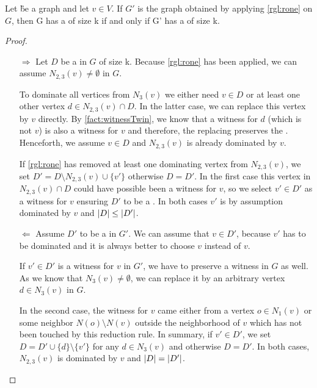 \begin{lemma}\label{lemma:correctnessone}
    Let \G be a graph and let $v \in V$. If $G'$ is the graph obtained by applying \cref{rgl:rone}   on $G$, then G has a \sdom of size k if and only if G' has a \sdom of size k.
\end{lemma}
\begin{proof}
    \begin{enumerate}
        \item[$\Rightarrow$] Let $D$ be a \sdom in $G$ of size k. 
        Because \cref{rgl:rone} has been applied, we can assume $N_{2,3}(v) \neq \emptyset$ in $G$. 
        
        To dominate all vertices from $N_3(v)$ we either need $v \in D$ or at least one other vertex $d \in N_{2,3}(v) \cap D$. In the latter case, we can replace this vertex by $v$ directly. By \cref{fact:witnessTwin}, we know that a witness for $d$  (which is not  $v$) is also a witness for $v$ and therefore, the replacing preserves the \sdom. Henceforth, we assume $v \in D$ and $N_{2,3}(v)$ is already dominated by $v$.

        If \cref{rgl:rone} has removed at least one dominating vertex from $N_{2,3}(v)$, we set $D' = D \setminus N_{2,3}(v) \cup \{v'\}$ otherwise $D = D'$. 
        In the first case this vertex in $N_{2,3}(v) \cap D$ could have possible been a witness for $v$, so we select $v' \in D'$ as a witness for $v$ ensuring $D'$ to be a \sdom. In both cases $v'$ is by assumption dominated by $v$ and  $\abs{D} \leq \abs{D'}$.

        \item[$\Leftarrow$]  Assume $D'$ to be a \sdom in $G'$. We can assume that $v \in D'$, because $v'$ has to be dominated and it is always better to choose $v$ instead of $v$.

        If $v' \in D'$ is a witness for $v$ in $G'$, we have to preserve a witness in $G$ as well. As we know that $N_3(v) \neq \emptyset$, we can replace it by an arbitrary vertex $d \in N_3(v)$ in $G$. 
        
        In the second case, the witness for $v$ came either from a vertex $o \in N_1(v)$ or some neighbor $N(o) \setminus N(v)$ outside the neighborhood of $v$ which has not been touched by this reduction rule. 
        In summary, if $v' \in D'$, we set $D = D' \cup \{d\} \setminus \{v'\}$ for any $d \in N_3(v)$ and otherwise $D = D'$. In both cases, $N_{2,3}(v)$ is dominated by $v$ and $\abs{D} = \abs{D'}$.
    \end{enumerate}
\end{proof}

